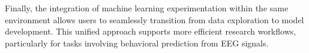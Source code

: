 Finally, the integration of machine learning experimentation within the same environment allows users to seamlessly transition from data exploration to model development. This unified approach supports more efficient research workflows, particularly for tasks involving behavioral prediction from EEG signals.







